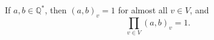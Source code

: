 If $a, b \in \mathbb{Q}^*$, then $(a, b)_v = 1$ for almost all $v \in V$, and
$$\prod_{v \in V} (a, b)_v = 1.$$
